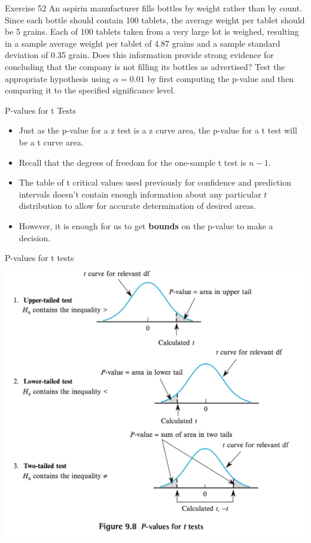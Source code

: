 \documentclass[
  ignorenonframetext,
]{beamer}
\providecommand{\tightlist}{%
  \setlength{\itemsep}{0pt}\setlength{\parskip}{0pt}}\usepackage{longtable,booktabs,array}
\begin{document}
\begin{frame}{Exercise 52}
\protect\hypertarget{exercise-52}{}
An aspirin manufacturer fills bottles by weight rather than by count.
Since each bottle should contain 100 tablets, the average weight per
tablet should be 5 grains. Each of 100 tablets taken from a very large
lot is weighed, resulting in a sample average weight per tablet of 4.87
grains and a sample standard deviation of 0.35 grain. Does this
information provide strong evidence for concluding that the company is
not filling its bottles as advertised? Test the appropriate hypothesis
using \(\alpha = 0.01\) by first computing the p-value and then
comparing it to the specified significance level.
\end{frame}

\begin{frame}{P-values for t Tests}
\protect\hypertarget{p-values-for-t-tests}{}
\begin{itemize}[<+->]
\tightlist
\item
  Just as the p-value for a z test is a z curve area, the p-value for a
  t test will be a t curve area.
\item
  Recall that the degrees of freedom for the one-sample t test is
  \(n-1\).
\item
  The table of t critical values used previously for confidence and
  prediction intervals doesn't contain enough information about any
  particular \(t\) distribution to allow for accurate determination of
  desired areas.
\item
  However, it is enough for us to get \textbf{bounds} on the p-value to
  make a decision.
\end{itemize}
\end{frame}

\begin{frame}{P-values for t tests}
\protect\hypertarget{p-values-for-t-tests-1}{}
\includegraphics{images/pvaluetcalc.png}
\end{frame}
\end{document}
